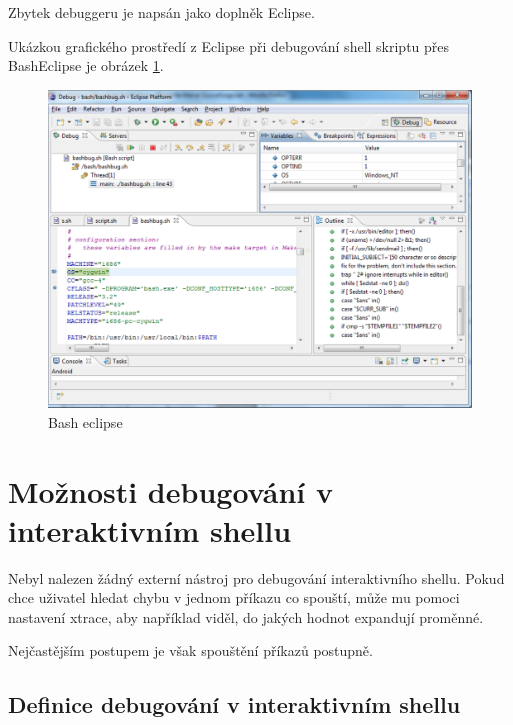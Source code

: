 \documentclass[thesis=M,czech]{FITthesis}[2012/06/26]
\begin{document}
Zbytek debuggeru je napsán jako doplněk Eclipse.

Ukázkou grafického prostředí z Eclipse při debugování shell skriptu přes BashEclipse je obrázek \ref{fig:bash_eclipse}.

\begin{figure}
	\includegraphics[width=1.0\textwidth]{./images/bash_eclipse}
	\caption{Bash eclipse}
	\label{fig:bash_eclipse}
\end{figure}





%
%
%
%
%
\section{Možnosti debugování v interaktivním shellu}

Nebyl nalezen žádný externí nástroj pro debugování interaktivního shellu. Pokud chce uživatel hledat chybu v jednom příkazu co spouští, může mu pomoci nastavení xtrace, aby například viděl, do jakých hodnot expandují proměnné.

Nejčastějším postupem je však spouštění příkazů postupně.

%
%
\subsection{Definice debugování v interaktivním shellu}
\end{document}

